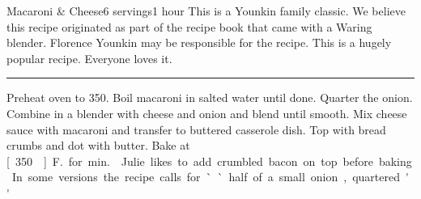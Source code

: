 \begin{recipe}{Macaroni \& Cheese}{6 servings}{1 hour}
\freeform This is a Younkin\tm{} family classic.  We believe this recipe originated as part of the recipe book that came with a Waring\tm{} blender.  Florence Younkin may be responsible for the recipe.  This is a hugely popular recipe.  Everyone loves it.\\
\rule{\textwidth}{0.05pt}
\hspace*{10mm}
\newstep
Preheat oven to 350\0.
Boil macaroni in salted water until done.
Quarter the onion.
 Combine in a blender with cheese and onion and blend until smooth.
\newstep Mix cheese sauce with macaroni and transfer to buttered casserole dish.
Top with bread crumbs and dot with butter.
\newstep Bake at \unit[350\0]{F.} for \unit[30]{min.}
\freeform Julie likes to add crumbled bacon on top before baking. In some versions the recipe calls for ``half of a small onion, quartered.''
\end{recipe}
